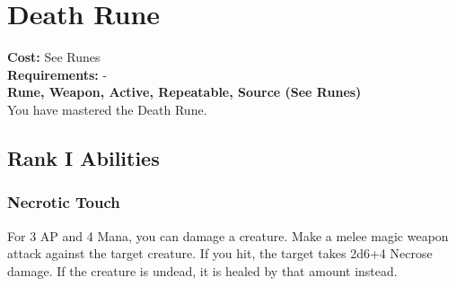 \section{Death Rune}\label{rune:death}
\textbf{Cost:} See Runes\\
\textbf{Requirements:} -\\
\textbf{Rune, Weapon, Active, Repeatable, Source (See Runes)}\\
You have mastered the Death Rune.

\subsection{Rank I Abilities}

\subsubsection{Necrotic Touch}
For 3 AP and 4 Mana, you can damage a creature.
Make a melee magic weapon attack against the target creature.
If you hit, the target takes 2d6+4 Necrose damage.
If the creature is undead, it is healed by that amount instead.